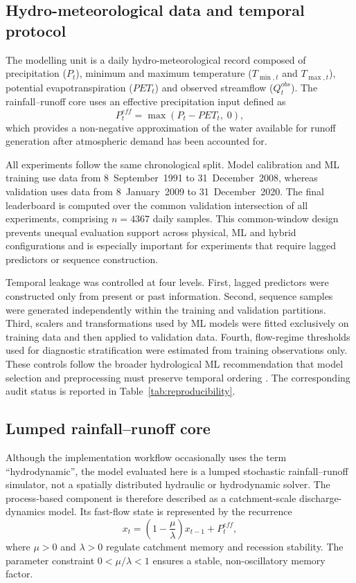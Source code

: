 \documentclass[a4paper,fleqn]{cas-sc}
\begin{document}
\subsection{Hydro-meteorological data and temporal protocol}
\label{subsec:data-protocol}

The modelling unit is a daily hydro-meteorological record composed of
precipitation ($P_t$), minimum and maximum temperature
($T_{\min,t}$ and $T_{\max,t}$), potential evapotranspiration
($PET_t$) and observed streamflow ($Q^{obs}_t$). The rainfall--runoff
core uses an effective precipitation input defined as
\begin{equation}
P^{eff}_t = \max(P_t - PET_t,\;0),
\label{eq:peff}
\end{equation}
which provides a non-negative approximation of the water available for
runoff generation after atmospheric demand has been accounted for.

All experiments follow the same chronological split. Model calibration
and ML training use data from 8~September~1991 to 31~December~2008,
whereas validation uses data from 8~January~2009 to 31~December~2020.
The final leaderboard is computed over the common validation
intersection of all experiments, comprising $n=4367$ daily samples. This
common-window design prevents unequal evaluation support across
physical, ML and hybrid configurations and is especially important for
experiments that require lagged predictors or sequence construction.

Temporal leakage was controlled at four levels. First, lagged predictors
were constructed only from present or past information. Second,
sequence samples were generated independently within the training and
validation partitions. Third, scalers and transformations used by ML
models were fitted exclusively on training data and then applied to
validation data. Fourth, flow-regime thresholds used for diagnostic
stratification were estimated from training observations only. These
controls follow the broader hydrological ML recommendation that model
selection and preprocessing must preserve temporal ordering
\citep{arsenault2022continuous,chen2013finding}. The corresponding
audit status is reported in Table~\ref{tab:reproducibility}.

\subsection{Lumped rainfall--runoff core}\label{subsec:physical-core}

Although the implementation workflow occasionally uses the term
``hydrodynamic'', the model evaluated here is a lumped stochastic
rainfall--runoff simulator, not a spatially distributed hydraulic or
hydrodynamic solver. The process-based component is therefore described
as a catchment-scale discharge-dynamics model. Its fast-flow state is
represented by the recurrence
\begin{equation}
x_t = \left(1 - \frac{\mu}{\lambda}\right)x_{t-1} + P^{eff}_t,
\label{eq:ramis-state}
\end{equation}
where $\mu>0$ and $\lambda>0$ regulate catchment memory and recession
stability. The parameter constraint $0<\mu/\lambda<1$ ensures a stable,
non-oscillatory memory factor.
\end{document}

